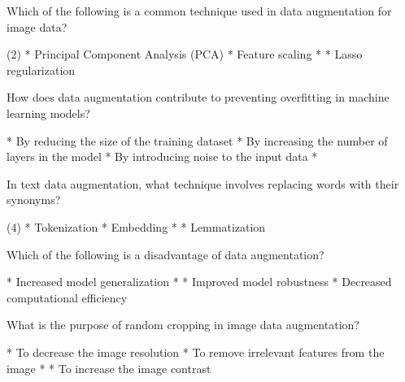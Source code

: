 \documentclass[10pt]{extarticle}
\begin{document}
\begin{exercise}
    Which of the following is a common technique used in data augmentation for image data?
    \begin{choice} (2)
        * Principal Component Analysis (PCA)
        * Feature scaling
        * 
        * Lasso regularization
    \end{choice}
\end{exercise}
\begin{solution}
\end{solution}


\begin{exercise}
    How does data augmentation contribute to preventing overfitting in machine learning models?
    \begin{choice}
        * By reducing the size of the training dataset
        * By increasing the number of layers in the model
        * By introducing noise to the input data
        * 
    \end{choice}
\end{exercise}
\begin{solution}
\end{solution}

\begin{exercise}
    In text data augmentation, what technique involves replacing words with their synonyms?
    \begin{choice}(4)
        * Tokenization
        * Embedding
        * 
        * Lemmatization
    \end{choice}
\end{exercise}
\begin{solution}
\end{solution}

\begin{exercise}
    Which of the following is a disadvantage of data augmentation?
    \begin{choice}
        * Increased model generalization
        * 
        * Improved model robustness
        * Decreased computational efficiency
    \end{choice}
\end{exercise}
\begin{solution}
\end{solution}

\begin{exercise}
    What is the purpose of random cropping in image data augmentation?
    \begin{choice}
        * To decrease the image resolution
        * To remove irrelevant features from the image
        * 
        * To increase the image contrast
    \end{choice}
\end{exercise}
\begin{solution}
\end{solution}
\end{document}
